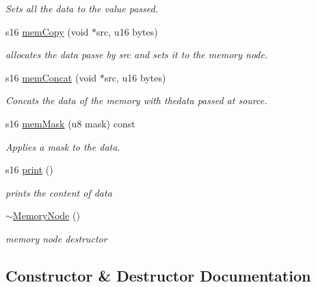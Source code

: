 \begin{DoxyCompactItemize}
\begin{DoxyCompactList}\small\item\em Sets all the data to the value passed. \end{DoxyCompactList}\item 
s16 \hyperlink{class_memory_node_ae8111a880a8d11ce39d73d841d147a44}{mem\+Copy} (void $\ast$src, u16 bytes)
\begin{DoxyCompactList}\small\item\em allocates the data passe by src and sets it to the memory node. \end{DoxyCompactList}\item 
s16 \hyperlink{class_memory_node_affb353802eb004abced42bcfc1e10d73}{mem\+Concat} (void $\ast$src, u16 bytes)
\begin{DoxyCompactList}\small\item\em Concats the data of the memory with thedata passed at source. \end{DoxyCompactList}\item 
s16 \hyperlink{class_memory_node_a5a9f89d13c46a4fcca917d7313b1e1d6}{mem\+Mask} (u8 mask) const
\begin{DoxyCompactList}\small\item\em Applies a mask to the data. \end{DoxyCompactList}\item 
s16 \hyperlink{class_memory_node_a97e6335a0d16bf6550b036d7a96c0f58}{print} ()
\begin{DoxyCompactList}\small\item\em prints the content of data \end{DoxyCompactList}\item 
\hyperlink{class_memory_node_abfffe599d76ee15d80521bb740e57a71}{$\sim$\+Memory\+Node} ()
\begin{DoxyCompactList}\small\item\em memory node destructor \end{DoxyCompactList}\end{DoxyCompactItemize}


\subsection{Constructor \& Destructor Documentation}
\mbox{\label{class_memory_node_a5b96575439c0b82ac4cfebf71209838a}} 
